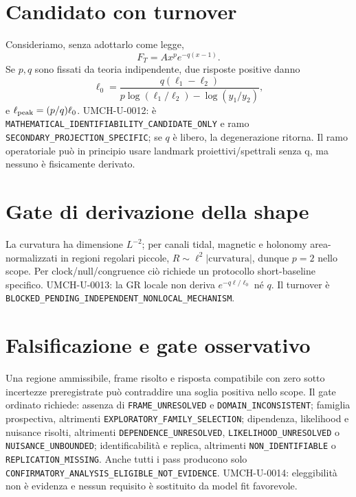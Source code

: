 \documentclass[11pt,a4paper]{article}
\begin{document}
\section{Candidato con turnover}\label{sec:u-turnover}
Consideriamo, senza adottarlo come legge,
\begin{equation}\label{eq:u-turnover}F_T=A x^p e^{-q(x-1)}.
\end{equation}
Se $p,q$ sono fissati da teoria indipendente, due risposte positive danno
\begin{equation}\label{eq:u-inversion}\ell_0=\frac{q(\ell_1-\ell_2)}{p\log(\ell_1/\ell_2)-\log(y_1/y_2)},\end{equation}
e $\ell_{\rm peak}=(p/q)\ell_0$. UMCH-U-0012: è \verb|MATHEMATICAL_IDENTIFIABILITY_CANDIDATE_ONLY| e ramo \verb|SECONDARY_PROJECTION_SPECIFIC|; se $q$ è libero, la degenerazione ritorna. Il ramo operatoriale può in principio usare landmark proiettivi/spettrali senza q, ma nessuno è fisicamente derivato.

\section{Gate di derivazione della shape}\label{sec:u-shape}
La curvatura ha dimensione $L^{-2}$; per canali tidal, magnetic e holonomy area-normalizzati in regioni regolari piccole, $R\sim\ell^2|\mathrm{curvatura}|$, dunque $p=2$ nello scope. Per clock/null/congruence ciò richiede un protocollo short-baseline specifico. UMCH-U-0013: la GR locale non deriva $e^{-q\ell/\ell_0}$ né $q$. Il turnover è \verb|BLOCKED_PENDING_INDEPENDENT_NONLOCAL_MECHANISM|.

\section{Falsificazione e gate osservativo}\label{sec:u-falsification}
Una regione ammissibile, frame risolto e risposta compatibile con zero sotto incertezze preregistrate può contraddire una soglia positiva nello scope. Il gate ordinato richiede: assenza di \verb|FRAME_UNRESOLVED| e \verb|DOMAIN_INCONSISTENT|; famiglia prospectiva, altrimenti \verb|EXPLORATORY_FAMILY_SELECTION|; dipendenza, likelihood e nuisance risolti, altrimenti \verb|DEPENDENCE_UNRESOLVED|, \verb|LIKELIHOOD_UNRESOLVED| o \verb|NUISANCE_UNBOUNDED|; identificabilità e replica, altrimenti \verb|NON_IDENTIFIABLE| o \verb|REPLICATION_MISSING|. Anche tutti i pass producono solo \verb|CONFIRMATORY_ANALYSIS_ELIGIBLE_NOT_EVIDENCE|. UMCH-U-0014: eleggibilità non è evidenza e nessun requisito è sostituito da model fit favorevole.
\end{document}
